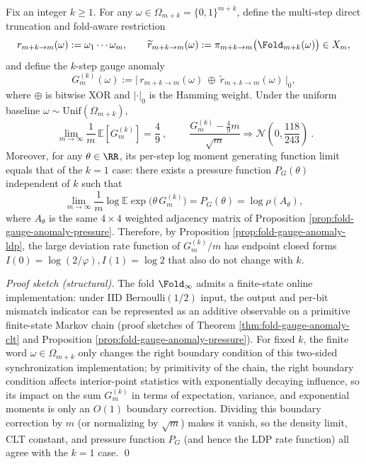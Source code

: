 \begin{theorem}\label{thm:fold-gauge-anomaly-kstep-invariance}
Fix an integer \(k\ge 1\).
For any \(\omega\in\Omega_{m+k}=\{0,1\}^{m+k}\), define the multi-step direct truncation and fold-aware restriction
\[
r_{m+k\to m}(\omega):=\omega_{1}\cdots\omega_{m},
\qquad
\widetilde r_{m+k\to m}(\omega):=\pi_{m+k\to m}\bigl(\Fold_{m+k}(\omega)\bigr)\in X_m,
\]
and define the \(k\)-step gauge anomaly
\[
G_m^{(k)}(\omega):=\bigl|\,r_{m+k\to m}(\omega)\ \oplus\ \widetilde r_{m+k\to m}(\omega)\,\bigr|_0,
\]
where \(\oplus\) is bitwise XOR and \(|\cdot|_0\) is the Hamming weight.
Under the uniform baseline \(\omega\sim\mathrm{Unif}(\Omega_{m+k})\),
\[
\boxed{\ \lim_{m\to\infty}\frac{1}{m}\,\mathbb E\!\left[G_m^{(k)}\right]=\frac49\ },
\qquad
\boxed{\ \frac{G_m^{(k)}-\frac49 m}{\sqrt m}\Rightarrow \mathcal N\!\left(0,\frac{118}{243}\right)\ }.
\]
Moreover, for any \(\theta\in\RR\), its per-step log moment generating function limit equals that of the \(k=1\) case: there exists a pressure function \(P_G(\theta)\) independent of \(k\) such that
\[
\lim_{m\to\infty}\frac{1}{m}\log\mathbb E\exp\!\bigl(\theta\,G_m^{(k)}\bigr)=P_G(\theta)=\log\rho(A_\theta),
\]
where \(A_\theta\) is the same \(4\times 4\) weighted adjacency matrix of Proposition \ref{prop:fold-gauge-anomaly-pressure}.
Therefore, by Proposition \ref{prop:fold-gauge-anomaly-ldp}, the large deviation rate function of \(G_m^{(k)}/m\) has endpoint closed forms \(I(0)=\log(2/\varphi), I(1)=\log 2\) that also do not change with \(k\).
\end{theorem}

\begin{proof}[Proof sketch (structural)]
The fold \(\Fold_\infty\) admits a finite-state online implementation: under IID Bernoulli\((1/2)\) input, the output and per-bit mismatch indicator can be represented as an additive observable on a primitive finite-state Markov chain (proof sketches of Theorem \ref{thm:fold-gauge-anomaly-clt} and Proposition \ref{prop:fold-gauge-anomaly-pressure}).
For fixed \(k\), the finite word \(\omega\in\Omega_{m+k}\) only changes the right boundary condition of this two-sided synchronization implementation; by primitivity of the chain, the right boundary condition affects interior-point statistics with exponentially decaying influence, so its impact on the sum \(G_m^{(k)}\) in terms of expectation, variance, and exponential moments is only an \(O(1)\) boundary correction.
Dividing this boundary correction by \(m\) (or normalizing by \(\sqrt m\)) makes it vanish, so the density limit, CLT constant, and pressure function \(P_G\) (and hence the LDP rate function) all agree with the \(k=1\) case. \qed
\end{proof}

